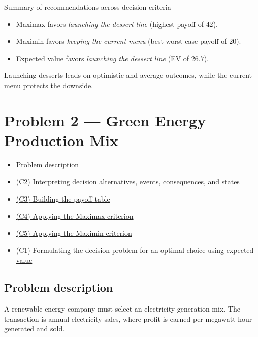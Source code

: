 \documentclass[11pt]{article}
\begin{document}
	Summary of recommendations across decision criteria
	\begin{itemize}
		\item Maximax favors \emph{launching the dessert line} (highest payoff of $42$).
		\item Maximin favors \emph{keeping the current menu} (best worst-case payoff of $20$).
		\item Expected value favors \emph{launching the dessert line} (EV of $26.7$).
	\end{itemize}
	
	Launching desserts leads on optimistic and average outcomes, while the current menu protects the downside.
	
	\section*{Problem 2 — Green Energy Production Mix}
	
	\hypertarget{problem2}{}
	
	\hypertarget{problem2-criteria}{}
	
	
	\begin{itemize}
		\item \hyperlink{problem2-problem}{Problem description}
		\item \hyperlink{problem2-c2}{(C2) Interpreting decision alternatives, events, consequences, and states}
		\item \hyperlink{problem2-c3}{(C3) Building the payoff table}
		\item \hyperlink{problem2-c4}{(C4) Applying the Maximax criterion}
		\item \hyperlink{problem2-c5}{(C5) Applying the Maximin criterion}
		\item \hyperlink{problem2-c1}{(C1) Formulating the decision problem for an optimal choice using expected value}
	\end{itemize}
	
	
	\subsection*{Problem description}
	
	\hypertarget{problem2-problem}{}
	
	A renewable-energy company must select an electricity generation mix. The transaction is annual electricity sales,
	where profit is earned per megawatt-hour generated and sold.
	
	
	
	
	
\end{document}
